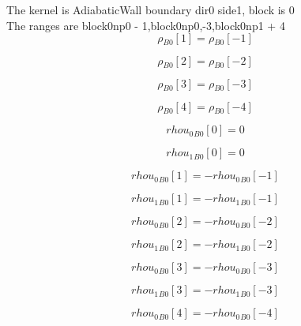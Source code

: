 \documentclass{article}
\begin{document}
\noindent The kernel is AdiabaticWall boundary dir0 side1, block is 0\\\noindent The ranges are block0np0 - 1,block0np0,-3,block0np1 + 4\\\begin{dmath}{\rho{_{B0}}}[{1}] = {\rho{_{B0}}}[{-1}]\end{dmath}

\begin{dmath}{\rho{_{B0}}}[{2}] = {\rho{_{B0}}}[{-2}]\end{dmath}

\begin{dmath}{\rho{_{B0}}}[{3}] = {\rho{_{B0}}}[{-3}]\end{dmath}

\begin{dmath}{\rho{_{B0}}}[{4}] = {\rho{_{B0}}}[{-4}]\end{dmath}

\begin{dmath}{rhou_{0}{_{B0}}}[{0}] = 0\end{dmath}

\begin{dmath}{rhou_{1}{_{B0}}}[{0}] = 0\end{dmath}

\begin{dmath}{rhou_{0}{_{B0}}}[{1}] = - {rhou_{0}{_{B0}}}[{-1}]\end{dmath}

\begin{dmath}{rhou_{1}{_{B0}}}[{1}] = - {rhou_{1}{_{B0}}}[{-1}]\end{dmath}

\begin{dmath}{rhou_{0}{_{B0}}}[{2}] = - {rhou_{0}{_{B0}}}[{-2}]\end{dmath}

\begin{dmath}{rhou_{1}{_{B0}}}[{2}] = - {rhou_{1}{_{B0}}}[{-2}]\end{dmath}

\begin{dmath}{rhou_{0}{_{B0}}}[{3}] = - {rhou_{0}{_{B0}}}[{-3}]\end{dmath}

\begin{dmath}{rhou_{1}{_{B0}}}[{3}] = - {rhou_{1}{_{B0}}}[{-3}]\end{dmath}

\begin{dmath}{rhou_{0}{_{B0}}}[{4}] = - {rhou_{0}{_{B0}}}[{-4}]\end{dmath}
\end{document}
